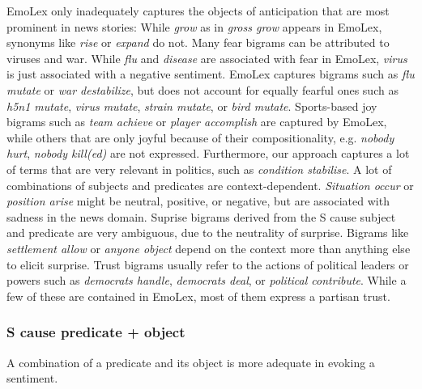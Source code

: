 EmoLex only inadequately captures the objects of anticipation that are most prominent in news stories: While \textit{grow} as in \textit{gross grow} appears in EmoLex, synonyms like \textit{rise} or \textit{expand} do not. Many fear bigrams can be attributed to viruses and war. While \textit{flu} and \textit{disease} are associated with fear in EmoLex, \textit{virus} is just associated with a negative sentiment. EmoLex captures bigrams such as \textit{flu mutate} or \textit{war destabilize}, but does not account for equally fearful ones such as \textit{h5n1 mutate}, \textit{virus mutate}, \textit{strain mutate}, or \textit{bird mutate}.
Sports-based joy bigrams such as \textit{team achieve} or \textit{player accomplish} are captured by EmoLex, while others that are only joyful because of their compositionality, e.g. \textit{nobody hurt}, \textit{nobody kill(ed)} are not expressed. Furthermore, our approach captures a lot of terms that are very relevant in politics, such as \textit{condition stabilise}.
A lot of combinations of subjects and predicates are context-dependent. \textit{Situation occur} or \textit{position arise} might be neutral, positive, or negative, but are associated with sadness in the news domain.
Suprise bigrams derived from the S cause subject and predicate are very ambiguous, due to the neutrality of surprise. Bigrams like \textit{settlement allow} or \textit{anyone object} depend on the context more than anything else to elicit surprise.
Trust bigrams usually refer to the actions of political leaders or powers such as \textit{democrats handle}, \textit{democrats deal}, or \textit{political contribute}. While a few of these are contained in EmoLex, most of them express a partisan trust.

\subsubsection{S cause predicate + object}

A combination of a predicate and its object is more adequate in evoking a sentiment. 

